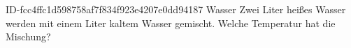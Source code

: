 \begin{exercise}
      {ID-fcc4ffc1d598758af7f834f923e4207e0dd94187}
      {Wasser}
  \ifproblem\problem
    Zwei Liter  heißes Wasser werden mit einem Liter 
    kaltem Wasser gemischt. Welche Temperatur hat die Mischung?
  \fi
\end{exercise}
